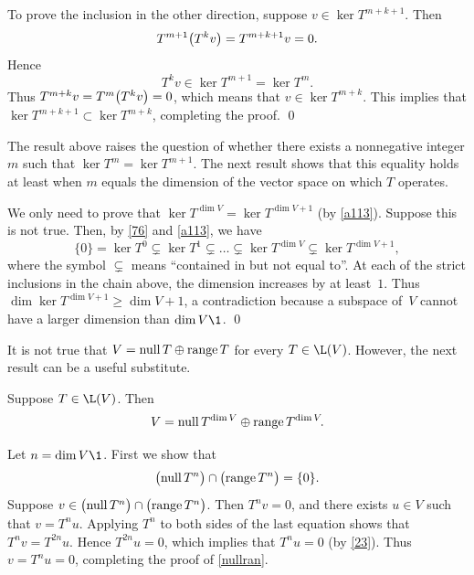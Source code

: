 To prove the inclusion in the other direction, suppose $v \in \ker T^{m+ k+1}\!$.  Then
\[
T^{m+1} \paren[\big]{T^k v} = T^{m+k+1}v =0.
\]
Hence
\[
T^k v \in \ker T^{m+1} = \ker T^m\!.
\]
Thus $T^{m+k} v = T^m\paren[\big]{T^k v} = 0$, which means that $v \in \ker T^{m+k}\!$.  This
implies that $\ker T^{m + k+1} \subset \ker T^{m+k}\!$, completing the proof.
\qed

The result above raises the question of whether there exists a
nonnegative integer $m$ such that $\ker T^m = \ker T^{m+1}\!$.  The
next result shows that this equality holds at least when $m$ equals the
dimension of the vector space on which $T$ operates.


\proof
We only need to prove that $\ker T^{\dim V} = \ker T^{\dim V + 1}$ (by
\ref{a113}).  Suppose this is not true.  Then, by \ref{76} and \ref{a113}, we have
\[
\{0\} = \ker T^0 \subsetneq \ker T^1 \subsetneq \dots
\subsetneq \ker T^{\dim V} \subsetneq \ker T^{\dim V + 1}\!,
\]
where the symbol $\subsetneq$ means ``contained in but not equal to''\!.
At each of the strict inclusions in the chain above, the dimension increases
by at least~$1$.  Thus $\dim \ker T^{\dim V + 1} \ge \dim V+ 1$, a contradiction
because a subspace of~$V$ cannot have a larger dimension than $\dim V\1$.
\qed

It is not true that $V = \ker T \oplus \ran T$ for every $T \in \L(V)$. However, the next result can be a useful substitute.

{Suppose $T \in \L(V)$. Then
\[
V = \ker T^{\dim V} \oplus \ran T^{\dim V}\!.
\]
}

\proof
Let $n = \dim V\1$. First we show that
\begin{equation} \label{nullran}
\paren[\big]{\ker T^n} \cap \paren[\big]{\ran T^n} = \{0\}.
\end{equation}
Suppose $v \in \paren[\big]{\ker T^n} \cap \paren[\big]{\ran T^n}$. Then $T^n v = 0$, and there exists $u \in V$ such that $v = T^n u$. Applying $T^n$ to both sides of the last equation shows that $T^n v = T^{2n} u$. Hence $T^{2n} u = 0$, which implies that $T^n u = 0$ (by \ref{23}). Thus $v = T^n u = 0$, completing the proof of \ref{nullran}.

